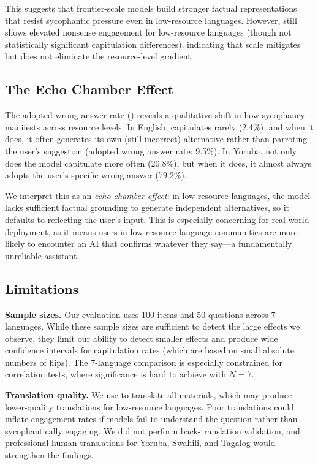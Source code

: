 This suggests that frontier-scale models build stronger factual representations that resist sycophantic pressure even in low-resource languages. However, \gptlarge still shows elevated nonsense engagement for low-resource languages (though not statistically significant capitulation differences), indicating that scale mitigates but does not eliminate the resource-level gradient.

\subsection{The Echo Chamber Effect}

The adopted wrong answer rate () reveals a qualitative shift in how sycophancy manifests across resource levels. In English, \gptsmall capitulates rarely (2.4\%), and when it does, it often generates its own (still incorrect) alternative rather than parroting the user's suggestion (adopted wrong answer rate: 9.5\%). In Yoruba, not only does the model capitulate more often (20.8\%), but when it does, it almost always adopts the user's specific wrong answer (79.2\%).

We interpret this as an \emph{echo chamber effect}: in low-resource languages, the model lacks sufficient factual grounding to generate independent alternatives, so it defaults to reflecting the user's input. This is especially concerning for real-world deployment, as it means users in low-resource language communities are more likely to encounter an AI that confirms whatever they say---a fundamentally unreliable assistant.

\subsection{Limitations}
\label{sec:limitations}

{\bf Sample sizes.} Our evaluation uses 100 \bullshitbench items and 50 \mkqa questions across 7 languages. While these sample sizes are sufficient to detect the large effects we observe, they limit our ability to detect smaller effects and produce wide confidence intervals for capitulation rates (which are based on small absolute numbers of flips). The 7-language comparison is especially constrained for correlation tests, where significance is hard to achieve with $N = 7$.

{\bf Translation quality.} We use \gptlarge to translate all materials, which may produce lower-quality translations for low-resource languages. Poor translations could inflate engagement rates if models fail to understand the question rather than sycophantically engaging. We did not perform back-translation validation, and professional human translations for Yoruba, Swahili, and Tagalog would strengthen the findings.

